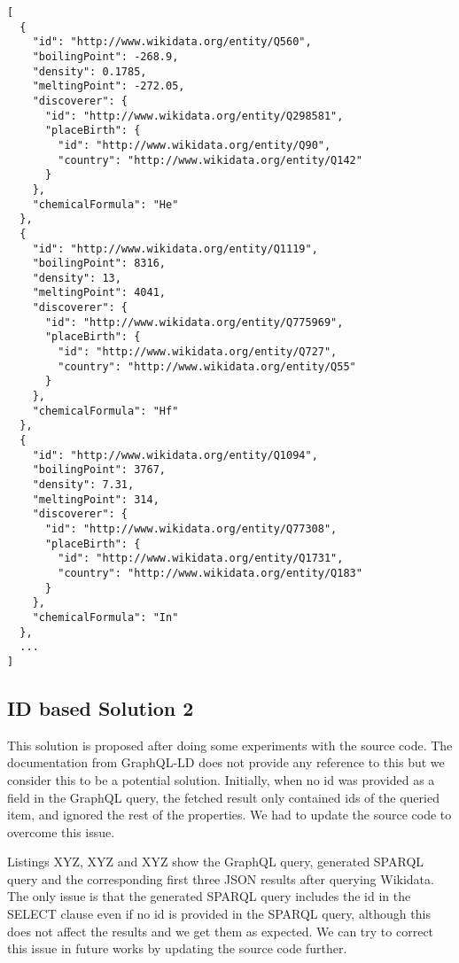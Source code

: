 \begin{minipage}{\linewidth}
\begin{lstlisting}[label=listing:listing22, caption={Output}]
[
  {
    "id": "http://www.wikidata.org/entity/Q560",        
    "boilingPoint": -268.9,
    "density": 0.1785,
    "meltingPoint": -272.05,
    "discoverer": {
      "id": "http://www.wikidata.org/entity/Q298581",   
      "placeBirth": {
        "id": "http://www.wikidata.org/entity/Q90",     
        "country": "http://www.wikidata.org/entity/Q142"
      }
    },
    "chemicalFormula": "He"
  },
  {
    "id": "http://www.wikidata.org/entity/Q1119",       
    "boilingPoint": 8316,
    "density": 13,
    "meltingPoint": 4041,
    "discoverer": {
      "id": "http://www.wikidata.org/entity/Q775969",
      "placeBirth": {
        "id": "http://www.wikidata.org/entity/Q727",
        "country": "http://www.wikidata.org/entity/Q55"
      }
    },
    "chemicalFormula": "Hf"
  },
  {
    "id": "http://www.wikidata.org/entity/Q1094",
    "boilingPoint": 3767,
    "density": 7.31,
    "meltingPoint": 314,
    "discoverer": {
      "id": "http://www.wikidata.org/entity/Q77308",
      "placeBirth": {
        "id": "http://www.wikidata.org/entity/Q1731",
        "country": "http://www.wikidata.org/entity/Q183"
      }
    },
    "chemicalFormula": "In"
  },
  ...
]
\end{lstlisting}
\end{minipage}

\subsection{ID based Solution 2}

This solution is proposed after doing some experiments with the source code. The documentation from GraphQL-LD does not provide any reference to this but we consider this to be a potential solution. Initially, when no id was provided as a field in the GraphQL query, the fetched result only contained ids of the queried item, and ignored the rest of the properties. We had to update the source code to overcome this issue.

Listings XYZ, XYZ and XYZ show the GraphQL query, generated SPARQL query and the corresponding first three JSON results after querying Wikidata. The only issue is that the generated SPARQL query includes the id in the SELECT clause even if no id is provided in the SPARQL query, although this does not affect the results and we get them as expected. We can try to correct this issue in future works by updating the source code further.

